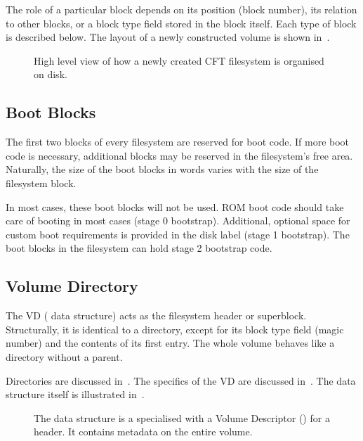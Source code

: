 The role of a particular block depends on its position (block number), its
relation to other blocks, or a block type field stored in the block
itself. Each type of block is described below. The layout of a newly
constructed volume is shown in~.

\begin{figure}
 \centering
 \caption[CFT filesystem overview]{\label{fig:filesystem-structure} High level
   view of how a newly created CFT filesystem is organised on disk.}
\end{figure}



\subsection{Boot Blocks}

The first two blocks of every filesystem are reserved for boot code. If more
boot code is necessary, additional blocks may be reserved in the filesystem's
free area. Naturally, the size of the boot blocks in words varies with the size
of the filesystem block.

In most cases, these boot blocks will not be used. ROM boot code should take
care of booting in most cases (stage 0 bootstrap). Additional, optional space
for custom boot requirements is provided in the disk label (stage 1
bootstrap). The boot blocks in the filesystem can hold stage 2 bootstrap
code.



\subsection{Volume Directory}

The \gls{VD} ( data structure) acts as the filesystem header or
superblock. Structurally, it is identical to a directory, except for its block
type field (magic number) and the contents of its first entry. The whole volume
behaves like a directory without a parent.

Directories are discussed in~. The specifics of the
\gls{VD} are discussed in~. The data structure itself is
illustrated in~.




\begin{figure}
 \centering
 \caption[CFT Volume data structure]{\label{fig:fs-volumedir} The
    data structure is a specialised  with a
   Volume Descriptor () for a header. It contains
   metadata on the entire volume.}
\end{figure}



